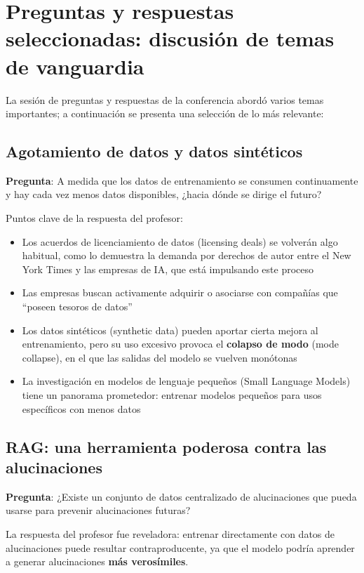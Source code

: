 \section{Preguntas y respuestas seleccionadas: discusión de temas de vanguardia}

La sesión de preguntas y respuestas de la conferencia abordó varios temas importantes; a continuación se presenta una selección de lo más relevante:

\subsection{Agotamiento de datos y datos sintéticos}

\textbf{Pregunta}: A medida que los datos de entrenamiento se consumen continuamente y hay cada vez menos datos disponibles, ¿hacia dónde se dirige el futuro?

Puntos clave de la respuesta del profesor:
\begin{itemize}
    \item Los acuerdos de licenciamiento de datos (licensing deals) se volverán algo habitual, como lo demuestra la demanda por derechos de autor entre el New York Times y las empresas de IA, que está impulsando este proceso
    \item Las empresas buscan activamente adquirir o asociarse con compañías que ``poseen tesoros de datos''
    \item Los datos sintéticos (synthetic data) pueden aportar cierta mejora al entrenamiento, pero su uso excesivo provoca el \textbf{colapso de modo} (mode collapse), en el que las salidas del modelo se vuelven monótonas
    \item La investigación en modelos de lenguaje pequeños (Small Language Models) tiene un panorama prometedor: entrenar modelos pequeños para usos específicos con menos datos
\end{itemize}

\subsection{RAG: una herramienta poderosa contra las alucinaciones}

\textbf{Pregunta}: ¿Existe un conjunto de datos centralizado de alucinaciones que pueda usarse para prevenir alucinaciones futuras?

La respuesta del profesor fue reveladora: entrenar directamente con datos de alucinaciones puede resultar contraproducente, ya que el modelo podría aprender a generar alucinaciones \textbf{más verosímiles}.

